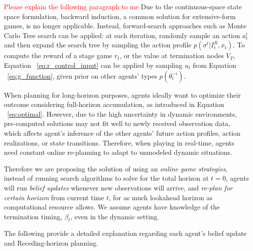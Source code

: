 \documentclass[letterpaper, 10 pt, conference]{ieeeconf}  %
\begin{document}
\textcolor{red}{Please explain the following paragraph to me} Due to the continuous-space state space formulation, backward induction, a common solution for extensive-form games, is no longer applicable. Instead, forward-search approaches such as Monte Carlo Tree search can be applied: at each iteration, randomly sample an action $a^i_t$ and then expand the search tree by sampling the action profile $p(\sigma^t|I^R_t,x_t)$. To compute the reward of a stage game $r_t$, or the value at termination nodes $V_T$, Equation ~\ref{eq:r_control_input} can be applied by sampling $u_t$ from Equation ~\ref{eq:g_function}, given prior on other agents' types $p(\theta^{-i}_t)$. 

When planning for long-horizon purposes, agents ideally want to optimize their outcome considering full-horizon accumulation, as introduced in Equation ~\ref{eq:optimal}. However, due to the high uncertainty in dynamic environments, pre-computed solutions may not fit well to newly received 
observation data, which affects agent's inference of the other agents' future action profiles, action realizations, or state transitions. Therefore, when playing in real-time, agents need constant online re-planning to adapt to unmodeled dynamic situations. 

Therefore we are proposing the solution of using an \textit{online game strategies}, instead of running search algorithms to solve for the total horizon at $t=0$, agents will run \textit{belief updates} whenever new observations will arrive, and \textit{re-plan for certain horizon} from current time $t$, for as much lookahead horizon as computational resource allows. We assume agents have knowledge of the termination timing, $\beta_t$, even in the dynamic setting.

The following provide a detailed explanation regarding each agent's belief update and Receding-horizon planning.
 
\end{document}
